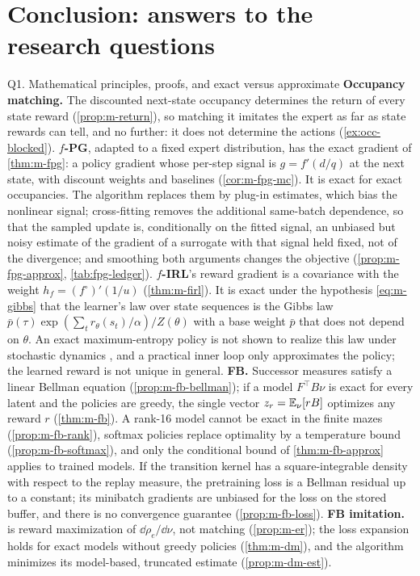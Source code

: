 \section{Conclusion: answers to the research questions}\label{sec:conclusion}

\begin{answerbox}{Q1. Mathematical principles, proofs, and exact versus approximate}
\textbf{Occupancy matching.} The discounted next-state occupancy determines the return of every state reward (\cref{prop:m-return}), so matching it imitates the expert as far as state rewards can tell, and no further: it does not determine the actions (\cref{ex:occ-blocked}).
\textbf{$f$-PG}, adapted to a fixed expert distribution, has the exact gradient of \cref{thm:m-fpg}: a policy gradient whose per-step signal is $g=f'(d/q)$ at the next state, with discount weights and baselines (\cref{cor:m-fpg-mc}). It is exact for exact occupancies. The algorithm replaces them by plug-in estimates, which bias the nonlinear signal; cross-fitting removes the additional same-batch dependence, so that the sampled update is, conditionally on the fitted signal, an unbiased but noisy estimate of the gradient of a surrogate with that signal held fixed, not of the divergence; and smoothing both arguments changes the objective (\cref{prop:m-fpg-approx}, \cref{tab:fpg-ledger}).
\textbf{$f$-IRL}'s reward gradient is a covariance with the weight $h_f=(f^\circ)'(1/u)$ (\cref{thm:m-firl}). It is exact under the hypothesis \eqref{eq:m-gibbs} that the learner's law over state sequences is the Gibbs law $\bar p(\tau)\exp(\sum_tr_\theta(s_t)/\alpha)/Z(\theta)$ with a base weight $\bar p$ that does not depend on $\theta$. An exact maximum-entropy policy is not shown to realize this law under stochastic dynamics , and a practical inner loop only approximates the policy; the learned reward is not unique in general.
\textbf{FB.} Successor measures satisfy a linear Bellman equation (\cref{prop:m-fb-bellman}); if a model $F^\top B\nu$ is exact for every latent and the policies are greedy, the single vector $z_r=\mathbb{E}_\nu[rB]$ optimizes any reward $r$ (\cref{thm:m-fb}). A rank-16 model cannot be exact in the finite mazes (\cref{prop:m-fb-rank}), softmax policies replace optimality by a temperature bound (\cref{prop:m-fb-softmax}), and only the conditional bound of \cref{thm:m-fb-approx} applies to trained models. If the transition kernel has a square-integrable density with respect to the replay measure, the pretraining loss is a Bellman residual up to a constant; its minibatch gradients are unbiased for the loss on the stored buffer, and there is no convergence guarantee (\cref{prop:m-fb-loss}).
\textbf{FB imitation.} \ERFB{} is reward maximization of $\dd\rho_e/\dd\nu$, not matching (\cref{prop:m-er}); the \DMFB{} loss expansion holds for exact models without greedy policies (\cref{thm:m-dm}), and the algorithm minimizes its model-based, truncated estimate (\cref{prop:m-dm-est}).
\end{answerbox}


